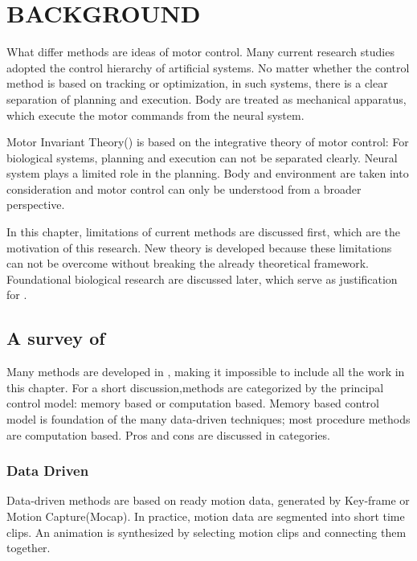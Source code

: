 \chapter{BACKGROUND}
\label{chap:background}

What differ \cms methods are ideas of motor control.
Many current \cms research studies adopted the control hierarchy of artificial systems.
No matter whether the control method is based on tracking or optimization, in such systems, there is a clear separation of planning and execution.
Body are treated as mechanical apparatus, which execute the motor commands from the neural system.

Motor Invariant Theory(\moit) is based on the integrative theory of motor control\citep{dickinson2000animals}:
For biological systems, planning and execution can not be separated clearly.
Neural system plays a limited role in the planning.
Body and environment are taken into consideration and motor control can only be understood from a broader perspective.

In this chapter, limitations of current \cms methods are discussed first, which are the motivation of this research.
New theory is developed because these limitations can not be overcome without breaking the already theoretical framework.
Foundational biological research are discussed later,  which serve as justification for \moit.



\section{A survey of \cms}

Many methods are developed in \cms, making it impossible to include all the work in this chapter.
For a short discussion,\cms methods are categorized by the principal control model: memory based or computation based.
Memory based control model is foundation of the  many data-driven techniques;
most procedure methods are computation based.
Pros and cons are discussed in categories.

\subsection{Data Driven}
Data-driven methods are based on ready motion data,  generated by Key-frame or Motion Capture(Mocap). 
In practice, motion data are segmented into short time clips. 
An animation is synthesized by selecting motion clips and connecting them together\citep{Parent2002,kovar2003flexible}.

